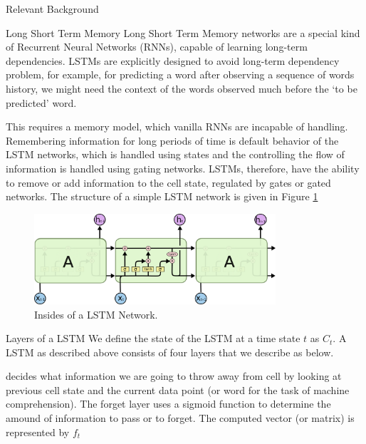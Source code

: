 \documentclass{article}
\begin{document}
\begin{psection}{Relevant Background}

	\begin{psubsection}{Long Short Term Memory}
		Long Short Term Memory \citep[LSTM,][]{lstm} networks are a special kind of Recurrent Neural Networks (RNNs), capable of learning long-term dependencies.
		LSTMs are explicitly designed to avoid long-term dependency problem, for example, for predicting a word after observing a sequence of words history, we might need the context of the words observed much before the `to be predicted' word.

		\sloppy 
		This requires a memory model, which vanilla RNNs are incapable of handling. Remembering information for long periods of time is default behavior of the LSTM networks, which is handled using states and the controlling the flow of information is handled using gating networks. LSTMs, therefore, have the ability to remove or add information to the cell state, regulated by gates or gated networks. The structure of a simple LSTM network is given in Figure \ref{fig:lstm}

		\begin{figure}[ht!]
			\centering
			\includegraphics[width=0.8\textwidth]{includes/lstm-chain.png}
			\caption{Insides of a LSTM Network. }
			\label{fig:lstm}
		\end{figure}


		\begin{pssubsection}{Layers of a LSTM}
			We define the state of the LSTM at a time state $t$ as $C_t$. A LSTM as described above consists of four layers that we describe as below.
			\begin{enumerate}[label=\bt{\theenumi.}]
					 decides what information we are going to throw away from cell by looking at previous cell state and the current data point (or word for the task of machine comprehension). The forget layer uses a sigmoid function to determine the amound of information to pass or to forget. The computed vector (or matrix) is represented by $f_t$


\end{enumerate}
\end{pssubsection}
\end{psubsection}
\end{psection}
\end{document}

